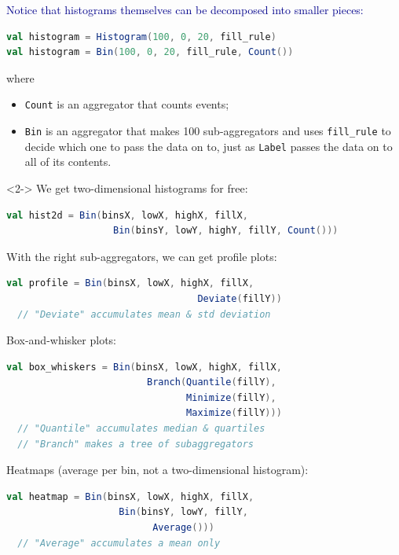 \documentclass{beamer}
\begin{document}
\begin{frame}[fragile]{}
\textcolor{darkblue}{\large Notice that histograms themselves can be decomposed into smaller pieces:}

\begin{lstlisting}[language=scala]
val histogram = Histogram(100, 0, 20, fill_rule)
val histogram = Bin(100, 0, 20, fill_rule, Count())
\end{lstlisting}

where
\begin{itemize}
\item {\tt \small Count} is an aggregator that counts events;
\item {\tt \small Bin} is an aggregator that makes 100 sub-aggregators and uses {\tt \small fill\_rule} to decide which one to pass the data on to, just as {\tt \small Label} passes the data on to all of its contents.
\end{itemize}

\vspace{0.5 cm}
\begin{uncoverenv}<2->
We get two-dimensional histograms for free:
\begin{lstlisting}[language=scala]
val hist2d = Bin(binsX, lowX, highX, fillX,
                   Bin(binsY, lowY, highY, fillY, Count()))
\end{lstlisting}
\end{uncoverenv}
\vspace{-1.5 cm}
\end{frame}

\begin{frame}[fragile]{}
\vspace{0.5 cm}
With the right sub-aggregators, we can get profile plots:
\begin{lstlisting}[language=scala]
val profile = Bin(binsX, lowX, highX, fillX,
                                  Deviate(fillY))
  // "Deviate" accumulates mean & std deviation
\end{lstlisting}

Box-and-whisker plots:
\begin{lstlisting}[language=scala]
val box_whiskers = Bin(binsX, lowX, highX, fillX,
                         Branch(Quantile(fillY),
                                Minimize(fillY),
                                Maximize(fillY)))
  // "Quantile" accumulates median & quartiles
  // "Branch" makes a tree of subaggregators
\end{lstlisting}

Heatmaps (average per bin, not a two-dimensional histogram):
\begin{lstlisting}[language=scala]
val heatmap = Bin(binsX, lowX, highX, fillX,
                    Bin(binsY, lowY, fillY,
                          Average()))
  // "Average" accumulates a mean only
\end{lstlisting}
\end{frame}
\end{document}
